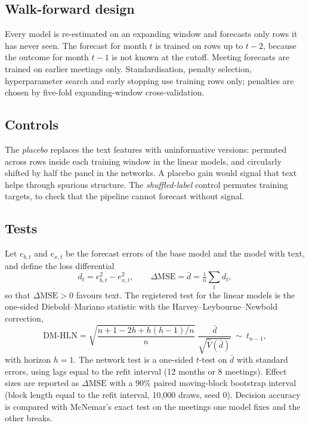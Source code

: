 \documentclass[11pt]{article}
\newcommand{\dmse}{\Delta\mathrm{MSE}}
\begin{document}
\subsection{Walk-forward design}

Every model is re-estimated on an expanding window and forecasts only rows it has never seen. The forecast for
month $t$ is trained on rows up to $t-2$, because the outcome for month $t-1$ is not known at the cutoff. Meeting
forecasts are trained on earlier meetings only. Standardisation, penalty selection, hyperparameter search and early
stopping use training rows only; penalties are chosen by five-fold expanding-window cross-validation.

\subsection{Controls}

The \emph{placebo} replaces the text features with uninformative versions: permuted across rows inside each
training window in the linear models, and circularly shifted by half the panel in the networks. A placebo gain
would signal that text helps through spurious structure. The \emph{shuffled-label} control permutes training
targets, to check that the pipeline cannot forecast without signal.

\subsection{Tests}

Let $e_{b,t}$ and $e_{x,t}$ be the forecast errors of the base model and the model with text, and define the loss
differential
\begin{equation}
  d_t = e_{b,t}^2 - e_{x,t}^2,\qquad \dmse = \bar d = \tfrac1n\textstyle\sum_t d_t ,
\end{equation}
so that $\dmse>0$ favours text. The registered test for the linear models is the one-sided Diebold--Mariano
statistic with the Harvey--Leybourne--Newbold correction,
\begin{equation}
  \text{DM-HLN} = \sqrt{\frac{n+1-2h+h(h-1)/n}{n}}\;\frac{\bar d}{\sqrt{\hat V(\bar d)}}\ \sim\ t_{n-1},
\end{equation}
with horizon $h=1$. The network test is a one-sided $t$-test on $\bar d$ with \citet{newey1987} standard errors,
using lags equal to the refit interval (12 months or 8 meetings). Effect sizes are reported as $\dmse$ with a 90\%
paired moving-block bootstrap interval (block length equal to the refit interval, 10,000 draws, seed 0). Decision
accuracy is compared with McNemar's exact test on the meetings one model fixes and the other breaks.
\end{document}
